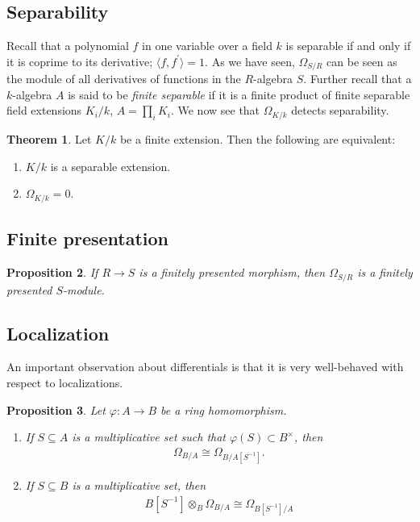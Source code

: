 \documentclass[letterpaper,10pt,twoside]{amsart}
\newcommand{\isom}{\cong}
\newcommand{\gen}[1]{\langle #1 \rangle}
\newcommand{\tens}{\otimes}
\theoremstyle{proposition}
\newtheorem{proposition}{Proposition}[section]
\theoremstyle{definition}
\theoremstyle{theorem}
\newtheorem{theorem}[proposition]{Theorem}
\theoremstyle{definition}
\theoremstyle{definition}
\theoremstyle{definition}
\theoremstyle{lemma}
\theoremstyle{definition}
\theoremstyle{definition}
\theoremstyle{corollary}
\theoremstyle{definition}
\begin{document}
	\subsection{Separability}
	Recall that a polynomial $f$ in one variable over a field $k$ is separable if and only if it is coprime to its derivative; $\gen{f,f^{\prime}} = 1$. As we have seen, $\Omega_{S/R}$ can be seen as the module of all derivatives of functions in the $R$-algebra $S$. Further recall that a $k$-algebra $A$ is said to be \textit{finite separable} if it is a finite product of finite separable field extensions $K_i/k$, $A = \prod_{i}K_i$. We now see that $\Omega_{K/k}$ detects separability.
	\begin{theorem}\label{T-Differentials vanish for separable extensions}
		Let $K/k$ be a finite extension. Then the following are equivalent:
		\begin{enumerate}
			\item {$K/k$ is a separable extension.}
			\item {$\Omega_{K/k} = 0$.}
		\end{enumerate}
	\end{theorem}
	\subsection{Finite presentation}
	\begin{proposition}\label{P-FP descends to Differentials}
		If $R\to S$ is a finitely presented morphism, then $\Omega_{S/R}$ is a finitely presented $S$-module.
	\end{proposition}
	
	\subsection{Localization}
	An important observation about differentials is that it is very well-behaved with respect to localizations.
	\begin{proposition}\label{P-Differential localization}
		Let $\varphi : A\to B$ be a ring homomorphism.
		\begin{enumerate}
			\item {If $S\subseteq A$ is a multiplicative set such that $\varphi(S) \subset B^{\times}$, then 
			\begin{align*}
				\Omega_{B/A} \isom \Omega_{B/A[S^{-1}]}.
			\end{align*}
			}
			\item {If $S\subseteq B$ is a multiplicative set, then 
			\begin{align*}
				B[S^{-1}] \tens_{B} \Omega_{B/A} \isom \Omega_{B[S^{-1}]/A}
			\end{align*}
			}
		\end{enumerate}
	\end{proposition}
	
\end{document}
